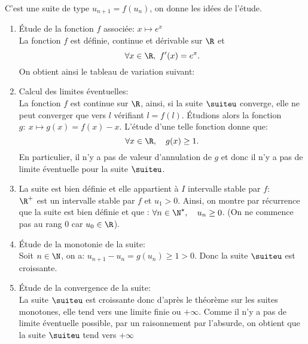 
\begin{correction} \;
C'est une suite de type $u_{n+1}=f(u_n)$, on donne les id\'ees de l'\'etude.
\begin{enumerate}
 \item \'Etude de la fonction $f$ associ\'ee: $x\mapsto e^x$\\
\noindent  La fonction $f$ est d\'efinie, continue et d\'erivable sur $\R$ et 
$$\forall x\in\R,\ f^{\prime}(x)=e^x.$$
On obtient ainsi le tableau de variation suivant:
\begin{center}
\end{center}
\item Calcul des limites \'eventuelles:\\
\noindent La fonction $f$ est continue sur $\R$, ainsi, si la suite $\suiteu$ converge, elle ne peut converger que vers $l$ v\'erifiant 
$l=f(l)$. 
\'Etudions alors la fonction $g:\ x\mapsto g(x)=f(x)-x$. L'\'etude d'une telle fonction donne que:
$$\forall x\in\R,\quad g(x)\geq 1.$$
En particulier, il n'y a pas de valeur d'annulation de $g$ et donc il n'y a pas de limite \'eventuelle pour la suite $\suiteu$.
\item La suite est bien d\'efinie et elle appartient \`{a} $I$ intervalle stable par $f$:\\
\noindent $\R^+$ est un intervalle stable par $f$ et $u_1>0$.
\noindent Ainsi, on montre par r\'ecurrence que la suite est bien d\'efinie et que : $\forall n\in\N^{\star},\quad u_n \geq 0$. (On ne commence pas au rang 0 car $u_0\in\R$).
\item \'Etude de la monotonie de la suite:\\
\noindent Soit $n\in\N$, on a: $u_{n+1}-u_n=g(u_n)\geq 1>0$. Donc la suite $\suiteu$ est croissante.
\item \'Etude de la convergence de la suite:\\
\noindent La suite $\suiteu$ est croissante donc d'apr\`es le th\'eor\`eme sur les suites monotones, elle tend vers une limite finie ou $+\infty$. Comme il n'y a pas de limite \'eventuelle possible, par un raisonnement par l'absurde, on obtient que la suite $\suiteu$ tend vers $+\infty$
\end{enumerate}
\end{correction}